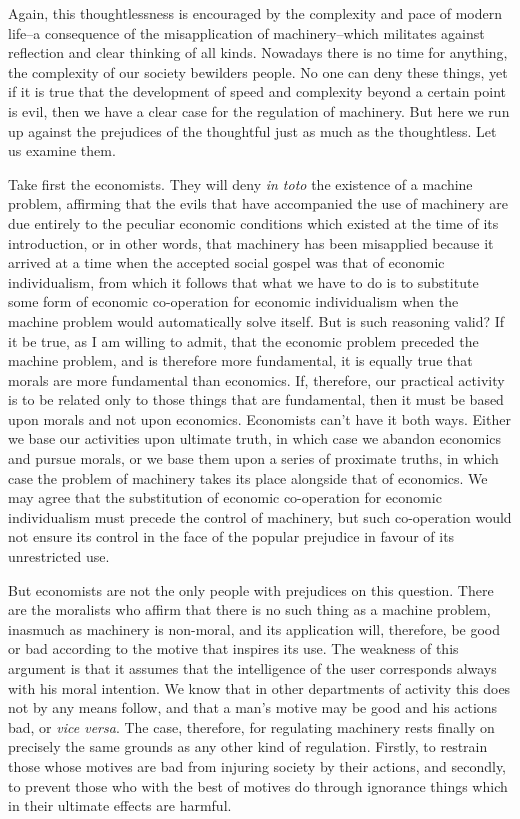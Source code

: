 \documentclass{book}
\begin{document}
Again, this thoughtlessness is encouraged by the complexity and pace of modern life–a consequence of the misapplication of machinery–which militates against reflection and clear thinking of all kinds. Nowadays there is no time for anything, the complexity of our society bewilders people. No one can deny these things, yet if it is true that the development of speed and complexity beyond a certain point is evil, then we have a clear case for the regulation of machinery. But here we run up against the prejudices of the thoughtful just as much as the thoughtless. Let us examine them.

Take first the economists. They will deny \emph{in toto} the existence of a machine problem, affirming that the evils that have accompanied the use of machinery are due entirely to the peculiar economic conditions which existed at the time of its introduction, or in other words, that machinery has been misapplied because it arrived at a time when the accepted social gospel was that of economic individualism, from which it follows that what we have to do is to substitute some form of economic co-operation for economic individualism when the machine problem would automatically solve itself. But is such reasoning valid? If it be true, as I am willing to admit, that the economic problem preceded the machine problem, and is therefore more fundamental, it is equally true that morals are more fundamental than economics. If, therefore, our practical activity is to be related only to those things that are fundamental, then it must be based upon morals and not upon economics. Economists can’t have it both ways. Either we base our activities upon ultimate truth, in which case we abandon economics and pursue morals, or we base them upon a series of proximate truths, in which case the problem of machinery takes its place alongside that of economics. We may agree that the substitution of economic co-operation for economic individualism must precede the control of machinery, but such co-operation would not ensure its control in the face of the popular prejudice in favour of its unrestricted use.

But economists are not the only people with prejudices on this question. There are the moralists who affirm that there is no such thing as a machine problem, inasmuch as machinery is non-moral, and its application will, therefore, be good or bad according to the motive that inspires its use. The weakness of this argument is that it assumes that the intelligence of the user corresponds always with his moral intention. We know that in other departments of activity this does not by any means follow, and that a man’s motive may be good and his actions bad, or \emph{vice versa}. The case, therefore, for regulating machinery rests finally on precisely the same grounds as any other kind of regulation. Firstly, to restrain those whose motives are bad from injuring society by their actions, and secondly, to prevent those who with the best of motives do through ignorance things which in their ultimate effects are harmful.
\end{document}

